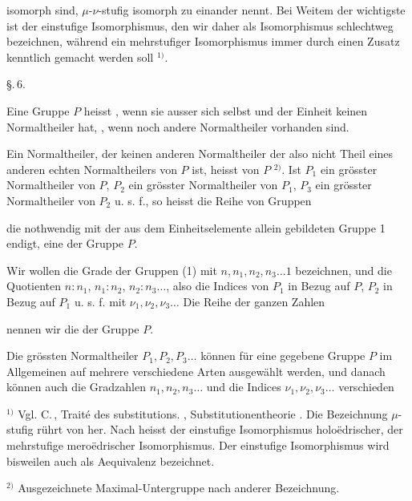 isomorph sind, $\mu$-$\nu$-stufig isomorph zu einander nennt. Bei
Weitem der wichtigste ist der einstufige Isomorphismus, den wir
daher als Isomorphismus schlechtweg bezeichnen, während ein
mehrstufiger Isomorphismus immer durch einen Zusatz kenntlich
gemacht werden soll $^{1)}$.

\begin{center}
\S.\,6.

\end{center}

Eine Gruppe $P$ heisst , wenn sie ausser sich selbst
und der Einheit keinen Normaltheiler hat, ,
wenn noch andere Normaltheiler vorhanden sind.

Ein Normaltheiler, der keinen anderen Normaltheiler  der also nicht Theil eines anderen echten Normaltheilers
 von $P$ ist, heisst 
von $P$ $^{2)}$. Ist $P_1$ ein grösster Normaltheiler von $P$, $P_2$ ein
grösster Normaltheiler von $P_1$, $P_3$ ein grösster Normaltheiler
von $P_2$ u. s. f., so heisst die Reihe von Gruppen


die nothwendig mit der aus dem Einheitselemente allein gebildeten
 Gruppe 1 endigt, eine  der
Gruppe $P$.

Wir wollen die Grade der Gruppen (1) mit $n, n_1, n_2, n_3 \ldots 1$
bezeichnen, und die Quotienten $n : n_1$, $n_1 : n_2$, $n_2 : n_3 \ldots$, also
die Indices von $P_1$ in Bezug auf $P$, $P_2$ in Bezug auf $P_1$ u. s. f.
mit $\nu_1, \nu_2, \nu_3 \ldots$ Die Reihe der ganzen Zahlen


nennen wir die  der Gruppe $P$.

Die grössten Normaltheiler $P_1, P_2, P_3 \ldots$ können für eine
gegebene Gruppe $P$ im Allgemeinen auf mehrere verschiedene
Arten ausgewählt werden, und danach können auch die Gradzahlen
 $n_1, n_2, n_3 \ldots$ und die Indices $\nu_1, \nu_2, \nu_3 \ldots$ verschieden

$^{1)}$ Vgl. C.\,, Traité des substitutions. , Substitutionentheorie
. Die Bezeichnung \glqq{}$\mu$-stufig\grqq{} rührt von  her. Nach 
heisst der einstufige Isomorphismus \glqq{}holoëdrischer\grqq{}, der mehrstufige
\glqq{}meroëdrischer\grqq{} Isomorphismus. Der einstufige Isomorphismus wird bisweilen
 auch als Aequivalenz bezeichnet.

$^{2)}$ Ausgezeichnete Maximal-Untergruppe nach anderer Bezeichnung.

